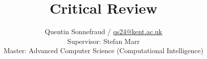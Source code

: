 \documentclass[a4paper, 11pt]{article}
\begin{document}
\title{Critical Review}
\author{Quentin Sonnefraud / \href{mailto:qs24@kent.ac.uk}{qs24@kent.ac.uk} \\
Supervisor: Stefan Marr\\
Master: Advanced Computer Science (Computational Intelligence)}
\date{}

\maketitle





\end{document}
